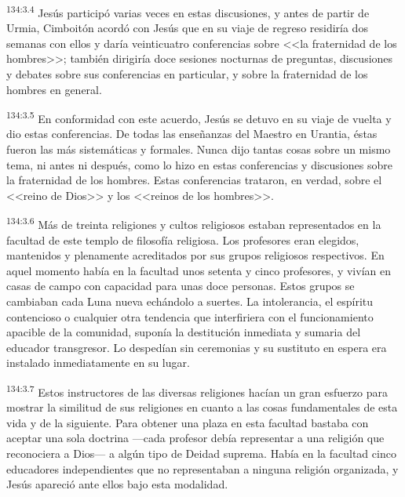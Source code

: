 \par 
\textsuperscript{134:3.4} Jesús participó varias veces en estas discusiones, y antes de partir de Urmia, Cimboitón acordó con Jesús que en su viaje de regreso residiría dos semanas con ellos y daría veinticuatro conferencias sobre <<la fraternidad de los hombres>>; también dirigiría doce sesiones nocturnas de preguntas, discusiones y debates sobre sus conferencias en particular, y sobre la fraternidad de los hombres en general.

\par 
\textsuperscript{134:3.5} En conformidad con este acuerdo, Jesús se detuvo en su viaje de vuelta y dio estas conferencias. De todas las enseñanzas del Maestro en Urantia, éstas fueron las más sistemáticas y formales. Nunca dijo tantas cosas sobre un mismo tema, ni antes ni después, como lo hizo en estas conferencias y discusiones sobre la fraternidad de los hombres. Estas conferencias trataron, en verdad, sobre el <<reino de Dios>> y los <<reinos de los hombres>>.

\par 
\textsuperscript{134:3.6} Más de treinta religiones y cultos religiosos estaban representados en la facultad de este templo de filosofía religiosa. Los profesores eran elegidos, mantenidos y plenamente acreditados por sus grupos religiosos respectivos. En aquel momento había en la facultad unos setenta y cinco profesores, y vivían en casas de campo con capacidad para unas doce personas. Estos grupos se cambiaban cada Luna nueva echándolo a suertes. La intolerancia, el espíritu contencioso o cualquier otra tendencia que interfiriera con el funcionamiento apacible de la comunidad, suponía la destitución inmediata y sumaria del educador transgresor. Lo despedían sin ceremonias y su sustituto en espera era instalado inmediatamente en su lugar.

\par 
\textsuperscript{134:3.7} Estos instructores de las diversas religiones hacían un gran esfuerzo para mostrar la similitud de sus religiones en cuanto a las cosas fundamentales de esta vida y de la siguiente. Para obtener una plaza en esta facultad bastaba con aceptar una sola doctrina ---cada profesor debía representar a una religión que reconociera a Dios--- a algún tipo de Deidad suprema. Había en la facultad cinco educadores independientes que no representaban a ninguna religión organizada, y Jesús apareció ante ellos bajo esta modalidad.

